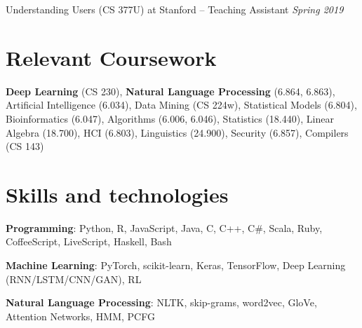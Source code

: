 \documentclass[margin,line]{resume}
\begin{document}
\begin{resume}
\vspace{-8mm}

Understanding Users (CS 377U) at Stanford -- Teaching Assistant \hfill \textsl{Spring 2019} \\


\vspace{-4mm}

\section{\mysidestyle Relevant Coursework}

\textbf{Deep Learning} (CS 230), \textbf{Natural Language Processing} (6.864, 6.863), Artificial Intelligence (6.034), Data Mining (CS 224w), Statistical Models (6.804), Bioinformatics (6.047), Algorithms (6.006, 6.046), Statistics (18.440), Linear Algebra (18.700), HCI (6.803), Linguistics (24.900), Security (6.857), Compilers (CS 143)

\section{\mysidestyle Skills and technologies}

\textbf{Programming}: Python, R, JavaScript, Java, C, C++, C\#, Scala, Ruby, CoffeeScript, LiveScript, Haskell, Bash

\vspace{-4mm}

\textbf{Machine Learning}: PyTorch, scikit-learn, Keras, TensorFlow, Deep Learning (RNN/LSTM/CNN/GAN), RL %

\vspace{-4mm}

\textbf{Natural Language Processing}: NLTK, skip-grams, word2vec, GloVe, Attention Networks, HMM, PCFG %


\vspace{-4mm}



\end{resume}
\end{document}
